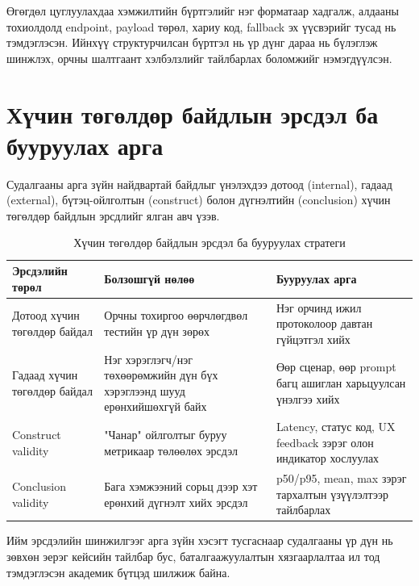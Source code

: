 Өгөгдөл цуглуулахдаа хэмжилтийн бүртгэлийг нэг форматаар хадгалж, алдааны тохиолдолд endpoint, payload төрөл, хариу код, fallback эх үүсвэрийг тусад нь тэмдэглэсэн. Ийнхүү структурчилсан бүртгэл нь үр дүнг дараа нь бүлэглэж шинжлэх, орчны шалтгаант хэлбэлзлийг тайлбарлах боломжийг нэмэгдүүлсэн.

\section{Хүчин төгөлдөр байдлын эрсдэл ба бууруулах арга}

Судалгааны арга зүйн найдвартай байдлыг үнэлэхдээ дотоод (internal), гадаад (external), бүтэц-ойлголтын (construct) болон дүгнэлтийн (conclusion) хүчин төгөлдөр байдлын эрсдлийг ялган авч үзэв.

\begin{table}[H]
\centering
\caption{Хүчин төгөлдөр байдлын эрсдэл ба бууруулах стратеги}
\label{tab:validity_threats}
\small
\setlength{\tabcolsep}{4pt}
\renewcommand{\arraystretch}{1.15}
\begin{tabularx}{\textwidth}{>{\raggedright\arraybackslash}p{2.8cm}>{\raggedright\arraybackslash}X>{\raggedright\arraybackslash}p{3.9cm}}
\toprule
\textbf{Эрсдэлийн төрөл} & \textbf{Болзошгүй нөлөө} & \textbf{Бууруулах арга} \\
\midrule
Дотоод хүчин төгөлдөр байдал & Орчны тохиргоо өөрчлөгдвөл тестийн үр дүн зөрөх & Нэг орчинд ижил протоколоор давтан гүйцэтгэл хийх \\
Гадаад хүчин төгөлдөр байдал & Нэг хэрэглэгч/нэг төхөөрөмжийн дүн бүх хэрэглээнд шууд ерөнхийшөхгүй байх & Өөр сценар, өөр prompt багц ашиглан харьцуулсан үнэлгээ хийх \\
Construct validity & "Чанар" ойлголтыг буруу метрикаар төлөөлөх эрсдэл & Latency, статус код, UX feedback зэрэг олон индикатор хослуулах \\
Conclusion validity & Бага хэмжээний сорьц дээр хэт ерөнхий дүгнэлт хийх эрсдэл & p50/p95, mean, max зэрэг тархалтын үзүүлэлтээр тайлбарлах \\
\bottomrule
\end{tabularx}
\normalsize
\end{table}

Ийм эрсдэлийн шинжилгээг арга зүйн хэсэгт тусгаснаар судалгааны үр дүн нь зөвхөн эерэг кейсийн тайлбар бус, баталгаажуулалтын хязгаарлалтаа ил тод тэмдэглэсэн академик бүтцэд шилжиж байна.

